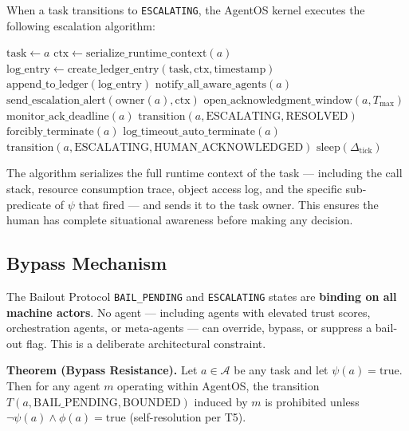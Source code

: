 When a task transitions to \texttt{ESCALATING}, the AgentOS kernel executes the following escalation algorithm:

\begin{algorithm}
\caption{Escalation Algorithm}
\begin{algorithmic}
\State $\text{task} \leftarrow a$
\State $\text{ctx} \leftarrow \text{serialize\_runtime\_context}(a)$
\State $\text{log\_entry} \leftarrow \text{create\_ledger\_entry}(\text{task}, \text{ctx}, \text{timestamp})$
\State $\text{append\_to\_ledger}(\text{log\_entry})$
\State $\text{notify\_all\_aware\_agents}(a)$
\State $\text{send\_escalation\_alert}(\text{owner}(a), \text{ctx})$
\State $\text{open\_acknowledgment\_window}(a, T_\text{max})$
\State $\text{monitor\_ack\_deadline}(a)$
\Statex
{}
\State $\text{transition}(a, \text{ESCALATING}, \text{RESOLVED})$
\State $\text{forcibly\_terminate}(a)$
\State $\text{log\_timeout\_auto\_terminate}(a)$
\State \Break
{}
\State $\text{transition}(a, \text{ESCALATING}, \text{HUMAN\_ACKNOWLEDGED})$
\State \Break
\EndIf
\State $\text{sleep}(\Delta_\text{tick})$
\EndWhile
\EndProcedure
\end{algorithmic}
\end{algorithm}

The algorithm serializes the full runtime context of the task — including the call stack, resource consumption trace, object access log, and the specific sub-predicate of $\psi$ that fired — and sends it to the task owner. This ensures the human has complete situational awareness before making any decision.

\subsection{Bypass Mechanism}

The Bailout Protocol \texttt{BAIL\_PENDING} and \texttt{ESCALATING} states are \textbf{binding on all machine actors}. No agent — including agents with elevated trust scores, orchestration agents, or meta-agents — can override, bypass, or suppress a bail-out flag. This is a deliberate architectural constraint.

\medskip\noindent\textbf{Theorem (Bypass Resistance).} Let $a \in \mathcal{A}$ be any task and let $\psi(a) = \text{true}$. Then for any agent $m$ operating within AgentOS, the transition $T(a, \text{BAIL\_PENDING}, \text{BOUNDED})$ induced by $m$ is prohibited unless $\neg\psi(a) \land \phi(a) = \text{true}$ (self-resolution per T5).

